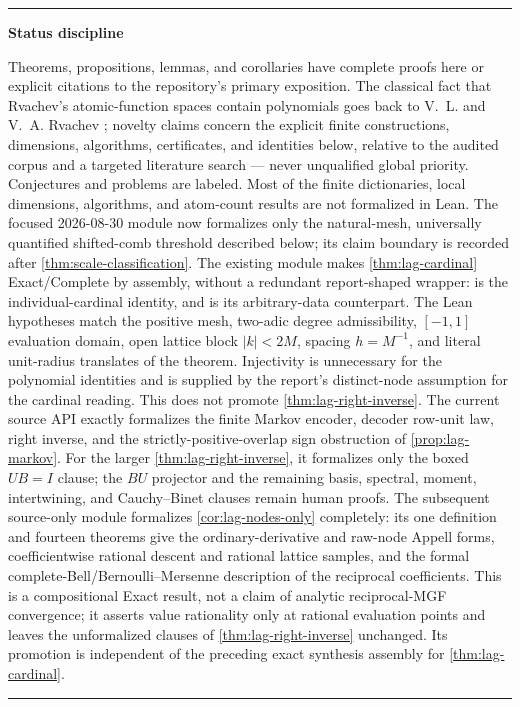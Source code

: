 \documentclass[11pt,oneside]{article}
\numberwithin{equation}{section}
\theoremstyle{definition}
\theoremstyle{remark}
\newenvironment{statusbox}[1]{%
  \par\smallskip\noindent\begin{center}\begin{minipage}{0.94\textwidth}%
  \hrule\vspace{0.5em}\noindent\textbf{#1}\par\smallskip
}{%
  \vspace{0.5em}\hrule\end{minipage}\end{center}\smallskip
}
\begin{document}
\begin{statusbox}{Status discipline}\small
Theorems, propositions, lemmas, and corollaries have complete proofs
here or explicit citations to the repository's primary exposition.
The classical fact that Rvachev's atomic-function spaces contain
polynomials goes back to V.~L. and V.~A. Rvachev
\cite{RvachevRvachev1972,Rvachev1990}; novelty claims concern the
explicit finite constructions, dimensions, algorithms, certificates,
and identities below, relative to the audited corpus and a targeted
literature search --- never unqualified global priority.  Conjectures
and problems are labeled.  Most of the finite dictionaries, local dimensions,
algorithms, and atom-count results are not formalized in Lean.  The focused
2026-08-30 module  now formalizes only the
natural-mesh, universally quantified shifted-comb threshold described below;
its claim boundary is recorded after \cref{thm:scale-classification}.
The existing module  makes
\cref{thm:lag-cardinal} Exact/Complete by assembly, without a redundant
report-shaped wrapper:
is the individual-cardinal identity, and
is its arbitrary-data counterpart.  The Lean hypotheses match the positive
mesh, two-adic degree admissibility, $[-1,1]$ evaluation domain, open lattice
block $\lvert k\rvert<2M$, spacing $h=M^{-1}$, and literal unit-radius
translates of the theorem.  Injectivity is unnecessary for the polynomial
identities and is supplied by the report's distinct-node assumption for the
cardinal reading.  This does not promote \cref{thm:lag-right-inverse}.
The current source API  exactly formalizes
the finite Markov encoder, decoder row-unit law, right inverse, and the
strictly-positive-overlap sign obstruction of \cref{prop:lag-markov}.  For the
larger \cref{thm:lag-right-inverse}, it formalizes only the boxed $UB=I$
clause; the $BU$ projector and the remaining basis, spectral, moment,
intertwining, and Cauchy--Binet clauses remain human proofs.
The subsequent source-only module 
formalizes \cref{cor:lag-nodes-only} completely: its one definition and
fourteen theorems give the ordinary-derivative and raw-node Appell forms,
coefficientwise rational descent and rational lattice samples, and the formal
complete-Bell/Bernoulli--Mersenne description of the reciprocal coefficients.
This is a compositional Exact result, not a claim of analytic reciprocal-MGF
convergence; it asserts value rationality only at rational evaluation points
and leaves the unformalized clauses of \cref{thm:lag-right-inverse}
unchanged.  Its promotion is independent of the preceding exact synthesis
assembly for \cref{thm:lag-cardinal}.
\end{statusbox}
\end{document}
